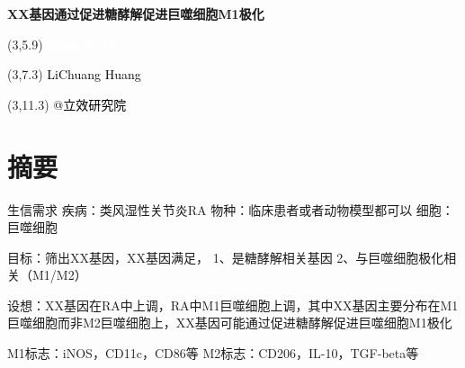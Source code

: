 \documentclass[
  ignorenonframetext,
]{beamer}
\author{}
\date{\vspace{-2.5em}}
\begin{document}
\begin{frame}
\begin{titlepage} 
\begin{center} \textbf{\Huge
XX基因通过促进糖酵解促进巨噬细胞M1极化}
\vspace{4em} \begin{textblock}{10}(3,5.9) \huge
\textbf{\textcolor{white}{2024-05-06}}
\end{textblock} \begin{textblock}{10}(3,7.3)
\Large \textcolor{black}{LiChuang Huang}
\end{textblock} \begin{textblock}{10}(3,11.3)
\Large \textcolor{black}{@立效研究院}
\end{textblock} \end{center} \end{titlepage}
\restoregeometry


\tableofcontents

\listoffigures

\listoftables



\end{frame}

\hypertarget{abstract}{%
\section{摘要}\label{abstract}}

\begin{frame}{生信需求}
\protect\hypertarget{ux751fux4fe1ux9700ux6c42}{}
疾病：类风湿性关节炎RA 物种：临床患者或者动物模型都可以 细胞：巨噬细胞

目标：筛出XX基因，XX基因满足， 1、是糖酵解相关基因
2、与巨噬细胞极化相关（M1/M2）

设想：XX基因在RA中上调，RA中M1巨噬细胞上调，其中XX基因主要分布在M1巨噬细胞而非M2巨噬细胞上，XX基因可能通过促进糖酵解促进巨噬细胞M1极化

M1标志：iNOS，CD11c，CD86等 M2标志：CD206，IL-10，TGF-beta等
\end{frame}
\end{document}
